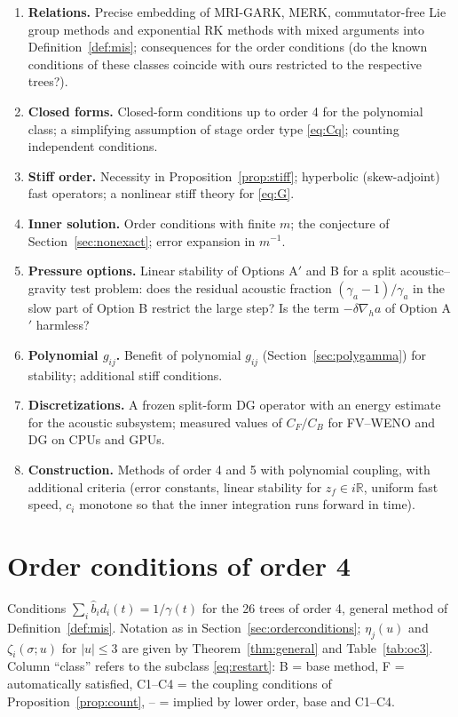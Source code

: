\documentclass[11pt,a4paper]{article}
\theoremstyle{definition}
\theoremstyle{remark}
\newcommand{\R}{\mathbb{R}}
\begin{document}
\begin{enumerate}
\item \textbf{Relations.} Precise embedding of MRI-GARK, MERK,
  commutator-free Lie group methods and exponential RK methods with mixed
  arguments into Definition~\ref{def:mis}; consequences for the order
  conditions (do the known conditions of these classes coincide with
  ours restricted to the respective trees?).
\item \textbf{Closed forms.} Closed-form conditions up to order 4 for
  the polynomial class; a simplifying assumption of stage order type
  \eqref{eq:Cq}; counting independent conditions.
\item \textbf{Stiff order.} Necessity in Proposition~\ref{prop:stiff};
  hyperbolic (skew-adjoint) fast operators; a nonlinear stiff theory
  for \eqref{eq:G}.
\item \textbf{Inner solution.} Order conditions with finite $m$; the
  conjecture of Section~\ref{sec:nonexact}; error expansion in $m^{-1}$.
\item \textbf{Pressure options.} Linear stability of Options A$'$ and B
  for a split acoustic--gravity test problem: does the residual acoustic
  fraction $(\gamma_a-1)/\gamma_a$ in the slow part of Option B restrict
  the large step? Is the term $-\delta\nabla_ha$ of Option A$'$ harmless?
\item \textbf{Polynomial $g_{ij}$.} Benefit of polynomial $g_{ij}$
  (Section~\ref{sec:polygamma}) for stability; additional stiff conditions.
\item \textbf{Discretizations.} A frozen split-form DG operator with an
  energy estimate for the acoustic subsystem; measured values of
  $C_F/C_B$ for FV--WENO and DG on CPUs and GPUs.
\item \textbf{Construction.} Methods of order 4 and 5 with polynomial
  coupling, with additional criteria (error constants, linear
  stability for $z_f\in i\R$, uniform fast speed, $c_i$ monotone so
  that the inner integration runs forward in time).
\end{enumerate}

\appendix
\section{Order conditions of order 4}
\label{app:order4}

Conditions $\sum_i\hat b_id_i(t)=1/\gamma(t)$ for the 26 trees of order
4, general method of Definition~\ref{def:mis}. Notation as in
Section~\ref{sec:orderconditions}; $\eta_j(u)$ and $\zeta_i(\sigma;u)$
for $|u|\le3$ are given by Theorem~\ref{thm:general} and
Table~\ref{tab:oc3}. Column ``class'' refers to the subclass
\eqref{eq:restart}: B = base method, F = automatically satisfied, C1--C4
= the coupling conditions of Proposition~\ref{prop:count}, -- = implied
by lower order, base and C1--C4.
\end{document}
